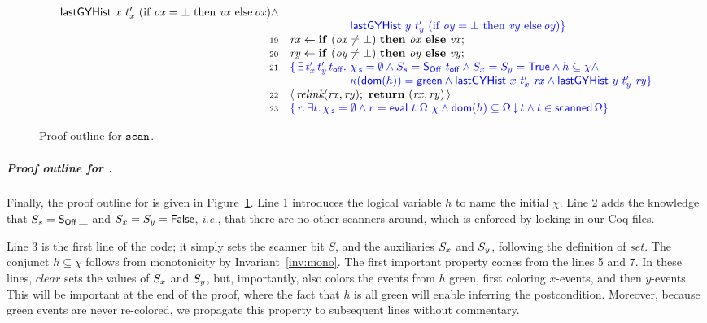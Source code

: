 \documentclass[a4paper,UKenglish]{lipics-v2016}
\newcommand{\asgn}{\leftarrow}
\newcommand{\ie}{\emph{i.e.}\xspace}
\newcommand{\dom}[1]{\mathsf{dom}(#1)}
\newcommand{\specK}[1]{\ensuremath{\textcolor{blue}{#1}}}
\newcommand{\aux}[1]{\textit{#1}}
\newcommand{\kw}[1]{\text{\textbf{#1}}}
\newcommand{\selfsub}{\mathsf{s}}
\newcommand{\hist}{\chi}
\newcommand{\histS}{\hist_{\, \selfsub}}
\newcommand{\hempty}{\emptyset}
\newcommand{\ldot}{\mathord{.}\,}
\def\FF{\mathsf{False}}
\def\TT{\mathsf{True}}
\newcommand{\C}{\kappa}
\newcommand{\stableorder}{\Omega}
\newcommand{\sOff}{\mathsf{S_{Off}}}
\newcommand{\var}[1]{\mathit{#1}}
\newcommand{\num}[1]{{\text{{\scriptsize{#1}}}}}
\def\lat{\langle}
\def\rat{\rangle}
\def\tbnd{\asgn}
\theoremstyle{definition}
\begin{document}
\begin{figure}[!htp]
\[\begin{array}[t]{r l}
{              \histLGY\ x\ t'_x\
                      (\textrm{if}\ \var{ox} = \bot\
                       \textrm{then}\ \var{vx}\
                       \textrm{else}\, \var{ox}) \wedge}\\
             & \specK{\hphantom{\{\,
                  \exists\, t'_x\, t'_y\, \toff \ldot}\,
                 \histLGY\ y\ t'_y\
                       (\textrm{if}\ \var{oy} = \bot\
                        \textrm{then}\ \var{vy}\ \textrm{else}\, \var{oy})\}}\\
  \num{19} & \var{rx} \tbnd \kw{if}\ (\var{ox} \neq\bot)\
                \kw{then}\ \var{ox}\ \kw{else}\ \var{vx};\\
  \num{20} & \var{ry} \tbnd \kw{if}\ (\var{oy} \neq\bot)\
                 \kw{then}\ \var{oy}\ \kw{else}\ \var{vy};\\
   \num{21} & \specK{\{\, \exists\, t'_x\, t'_y\, \toff \ldot\,
              \histS = \hempty \wedge
              \sss = \sOff\ \toff \wedge \sx = \sy = \TT \wedge
              h \subseteq \hist \wedge}\\
             & \specK{\hphantom{\{\,
                  \exists\, t'_x\, t'_y\, \toff \ldot}\,
              \C(\dom{h}) = \mathsf{green} \wedge
              \histLGY\ x\ t'_x\ \var{rx} \wedge
              \histLGY\ y\ t'_y\ \var{ry}\}}\\
  \num{22} & \lat\,\aux{relink}(\var{rx}, \var{ry});\
                \kw{return}\ (\var{rx}, \var{ry})\,\rat \\
  \num{23} & \specK{\{\, r\ldot \exists t\ldot \histS = \hempty \wedge
    r = \eval\ t\ {\stableorder}\ {\hist} \wedge
    \dom{h} \subseteq \ideal{\stableorder}{t} \wedge
    t \in \scanned{\stableorder}\}}
\end{array}
\]
  \caption{\label{proof:scan} Proof outline for $\texttt{scan}$.}
\end{figure}

\subparagraph{Proof outline for \jyscan.}
%
Finally, the proof outline for is given in
Figure~\ref{proof:scan}. Line 1 introduces the logical variable $h$ to
name the initial $\hist$. Line 2 adds the knowledge that $\sss =
\sOff\, \_$ and $\sx = \sy = \FF$, \ie, that there are no other
scanners around, which is enforced by locking in our Coq files.

Line 3 is the first line of the code; it simply sets the scanner bit
$S$, and the auxiliaries $S_x$ and $S_y$, following the definition of
$\aux{set}$. The conjunct $h \subseteq \hist$ follows from
monotonicity by Invariant~\ref{inv:mono}.
%
The first important property comes from the lines 5 and 7. In these
lines, $\aux{clear}$ sets the values of $S_x$ and $S_y$, but,
importantly, also colors the events from $h$ green, first coloring
$x$-events, and then $y$-events. This will be important at the end of
the proof, where the fact that $h$ is all green will enable inferring
the postcondition. Moreover, because green events are never
re-colored, we propagate this property to subsequent lines without
commentary.
\end{document}
